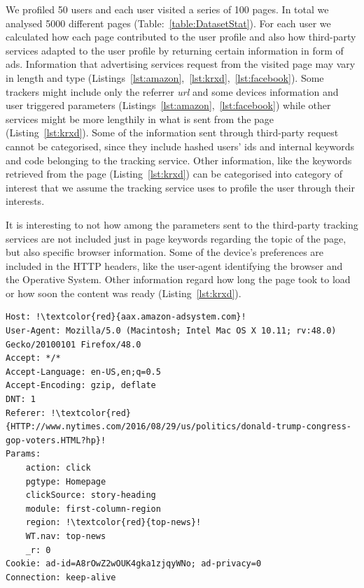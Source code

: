 We profiled 50 users and each user visited a series of 100 pages. In total we analysed 5000 different pages (Table:~\ref{table:DatasetStat}). For each user we calculated how each page contributed to the user profile and also how third-party services adapted to the user profile by returning certain information in form of ads. Information that advertising services request from the visited page may vary in length and type (Listings~\ref{lst:amazon},~\ref{lst:krxd},~\ref{lst:facebook}). Some trackers might include only the referrer \emph{url} and some devices information and user triggered parameters (Listings~\ref{lst:amazon},~\ref{lst:facebook}) while other services might be more lengthily in what is sent from the page (Listing~\ref{lst:krxd}). Some of the information sent through third-party request cannot be categorised, since they include hashed users' ids and internal keywords and code belonging to the tracking service. Other information, like the keywords retrieved from the page (Listing~\ref{lst:krxd}) can be categorised into category of interest that we assume the tracking service uses to profile the user through their interests.

It is interesting to not how among the parameters sent to the third-party tracking services are not included just in page keywords regarding the topic of the page, but also specific browser information. Some of the device's preferences are included in the HTTP headers, like the user-agent identifying the browser and the Operative System. Other information regard how long the page took to load or how soon the content was ready (Listing~\ref{lst:krxd}).

\begin{lstlisting}[frame=single, breaklines=true, keepspaces=true, basicstyle=\tiny, escapechar=!]
Host: !\textcolor{red}{aax.amazon-adsystem.com}!
User-Agent: Mozilla/5.0 (Macintosh; Intel Mac OS X 10.11; rv:48.0)
Gecko/20100101 Firefox/48.0
Accept: */*
Accept-Language: en-US,en;q=0.5
Accept-Encoding: gzip, deflate
DNT: 1
Referer: !\textcolor{red}{HTTP://www.nytimes.com/2016/08/29/us/politics/donald-trump-congress-gop-voters.HTML?hp}!
Params:
	action: click
	pgtype: Homepage
	clickSource: story-heading
	module: first-column-region
	region: !\textcolor{red}{top-news}!
	WT.nav: top-news
	_r: 0
Cookie: ad-id=A8rOwZ2wOUK4gka1zjqyWNo; ad-privacy=0
Connection: keep-alive
\end{lstlisting}

